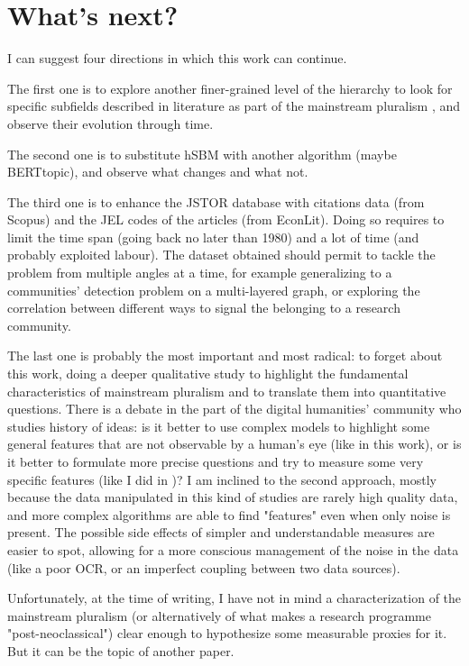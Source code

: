 \documentclass[a4paper, 11pt, headings=standardclasses, tablecaptionsbelow]{scrartcl}
\begin{document}
\section{What's next?}
I can suggest four directions in which this work can continue.

The first one is to explore another finer-grained level of the hierarchy to look for specific subfields described in literature as part of the mainstream pluralism \parencite[§1]{davis2006}, and observe their evolution through time.

The second one is to substitute hSBM with another algorithm (maybe BERTtopic), and observe what changes and what not.

The third one is to enhance the JSTOR database with citations data (from Scopus) and the JEL codes of the articles (from EconLit). Doing so requires to limit the time span (going back no later than 1980) and a lot of time (and probably exploited labour).
The dataset obtained should permit to tackle the problem from multiple angles at a time, for example generalizing to a communities' detection problem on a multi-layered graph, or exploring the correlation between different ways to signal the belonging to a research community.

The last one is probably the most important and most radical: to forget about this work, doing a deeper qualitative study to highlight the fundamental characteristics of mainstream pluralism and to translate them into quantitative questions.
There is a debate in the part of the digital humanities' community who studies history of ideas: is it better to use complex models to highlight some general features that are not observable by a human's eye (like in this work), or is it better to formulate more precise questions and try to measure some very specific features (like I did in \textcite{babbiotti2022})?
I am inclined to the second approach, mostly because the data manipulated in this kind of studies are rarely high quality data, and more complex algorithms are able to find "features" even when only noise is present. The possible side effects of simpler and understandable measures are easier to spot, allowing for a more conscious management of the noise in the data (like a poor OCR, or an imperfect coupling between two data sources).

Unfortunately, at the time of writing, I have not in mind a characterization of the mainstream pluralism (or alternatively of what makes a research programme "post-neoclassical") clear enough to hypothesize some measurable proxies for it. But it can be the topic of another paper.
\end{document}
